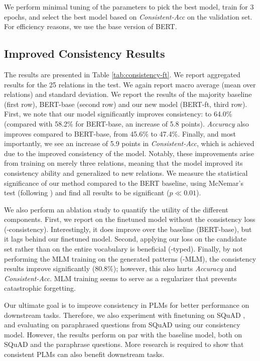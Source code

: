 We perform minimal tuning of the parameters  to pick the best model, train for 3 epochs, and select the best model based on  \textit{Consistent-Acc} on the validation set.
For efficiency reasons, we use the base version of BERT.



\subsection{Improved Consistency Results}



The results are presented in Table
\ref{tab:consistency-ft}. We report aggregated results
for the 25 relations in the test.
We again
report macro average (mean over relations) and
standard deviation.  We report the results of the majority
baseline (first row),   BERT-base  (second row)
and our new model (BERT-ft, third row).  First, we note
that our model significantly improves consistency:
to 64.0\%
(compared with 58.2\% for BERT-base,
an increase
of 5.8 points).  \textit{Accuracy} also improves compared to BERT-base, from 45.6\% to 47.4\%. Finally, and most
importantly, we see an increase of 5.9 points in
\textit{Consistent-Acc}, which is achieved due to the improved
consistency of the model.  Notably, these improvements
arise from training on merely three relations, meaning that
the model improved its consistency ability and generalized
to new relations.  We measure the statistical
significance of our method compared to the BERT baseline,
using McNemar's test (following
\citet{dror2018hitchhiker,dror2020statistical}) and find all
results to be significant ($p \ll 0.01$).


We also perform an ablation study to quantify the utility of
the different components. First, we report on the finetuned
model without the consistency loss
(-consistency). Interestingly, it does improve over the
baseline (BERT-base), but it lags behind our finetuned model.
Second, applying our loss on the candidate set rather than
on the entire vocabulary is beneficial (-typed). Finally, by
not performing the MLM training on the generated patterns
(-MLM), the consistency results improve significantly
(80.8\%); however, this also hurts  \textit{Accuracy} and \textit{Consistent-Acc}.
MLM training seems to serve as a regularizer
that prevents catastrophic forgetting.


Our ultimate goal is to improve consistency in PLMs for better performance on downstream tasks. Therefore, we also experiment with finetuning on SQuAD \cite{squad}, and evaluating on paraphrased questions from SQuAD \cite{squad-paraphrase} using our consistency model. However, the results perform on par with the baseline model, both on SQuAD and the paraphrase questions. More research is required to show that consistent PLMs can also benefit downstream tasks.
